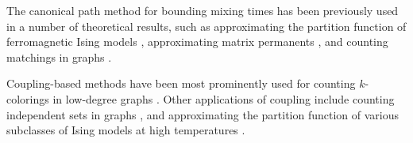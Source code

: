 The canonical path method for bounding mixing times has been previously used in a number of theoretical results, such as approximating the partition function of ferromagnetic Ising models \citep{jerrum93}, approximating matrix permanents \citep{jerrum89,jerrum04perm}, and counting matchings in graphs \citep{jerrum03}.

Coupling-based methods have been most prominently used for counting $k$-colorings in low-degree graphs \citep{jerrum95,bubley98,jerrum03}.
Other applications of coupling include counting independent sets in graphs \citep{dyer00}, and approximating the partition function of various subclasses of Ising models at high temperatures \citep{levin08book}.